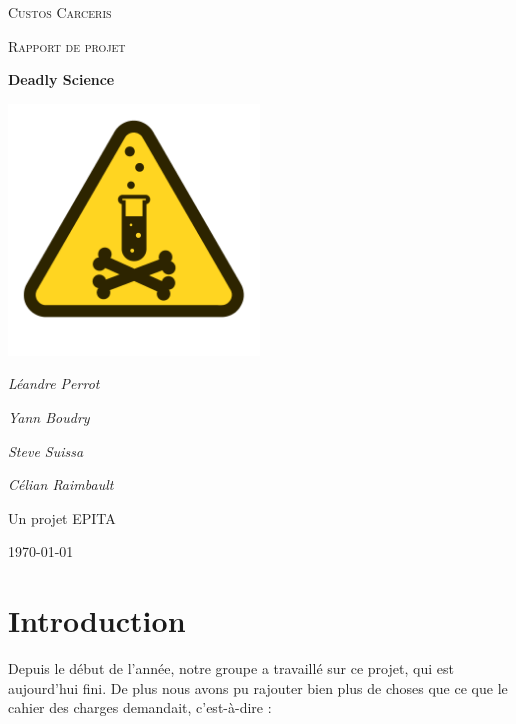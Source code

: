 \documentclass{article}
\begin{document}
\begin{titlepage}
	\centering
	{\scshape\LARGE Custos Carceris\par}
	\vspace{1cm}
	{\scshape\Large Rapport de projet\par}
	\vspace{1.5cm}
	{\huge\bfseries Deadly Science\par}
	\vspace{2cm}
	\includegraphics[width=0.5\textwidth]{logo.png}\par\vspace{1cm}
	{\Large\itshape Léandre Perrot\par}
	{\Large\itshape Yann Boudry\par}
	{\Large\itshape Steve Suissa\par}
	{\Large\itshape Célian Raimbault\par}
	\vfill
	Un projet EPITA
	\vfill
	{\large \today\par}
\end{titlepage}



\newpage
\tableofcontents



\newpage
\section{Introduction}
Depuis le début de l'année, notre groupe a travaillé sur ce projet, qui est aujourd'hui fini. De plus nous avons pu rajouter bien plus de choses que ce que le cahier des charges demandait, c'est-à-dire :
\end{document}
